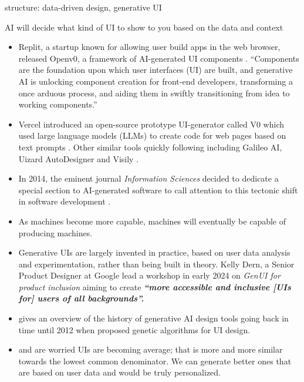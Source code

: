 \documentclass[
  letterpaper,
  DIV=11,
  numbers=noendperiod]{scrartcl}
\providecommand{\tightlist}{%
  \setlength{\itemsep}{0pt}\setlength{\parskip}{0pt}}\usepackage{longtable,booktabs,array}
\begin{document}
structure: data-driven design, generative UI

AI will decide what kind of UI to show to you based on the data and
context

\begin{itemize}
\tightlist
\item
  Replit, a startup known for allowing user build apps in the web
  browser, released Openv0, a framework of AI-generated UI components
  \citep{replitReplitOpenv0OpenSource2023}. ``Components are the
  foundation upon which user interfaces (UI) are built, and generative
  AI is unlocking component creation for front-end developers,
  transforming a once arduous process, and aiding them in swiftly
  transitioning from idea to working components.''
\item
  Vercel introduced an open-source prototype UI-generator called V0
  which used large language models (LLMs) to create code for web pages
  based on text prompts \citep{vercelIntroducingV0Generative2023}. Other
  similar tools quickly following including Galileo AI, Uizard
  AutoDesigner and Visily \citep{WhoBenefitsMost2024}.
\item
  In 2014, the eminent journal \emph{Information Sciences} decided to
  dedicate a special section to AI-generated software to call attention
  to this tectonic shift in software development
  \citep{reformatSpecialSectionApplications2014}.
\item
  As machines become more capable, machines will eventually be capable
  of producing machines.
\item
  Generative UIs are largely invented in practice, based on user data
  analysis and experimentation, rather than being built in theory. Kelly
  Dern, a Senior Product Designer at Google lead a workshop in early
  2024 on \emph{GenUI for product inclusion} aiming to create
  \textbf{\emph{``\textbf{more accessible and inclusive {[}UIs for{]}
  users of all backgrounds}''.}}
\item
  \citep{GenerativeUIDesign2023} gives an overview of the history of
  generative AI design tools going back in time until 2012 when
  \citep{troianoGeneticAlgorithmsSupporting2014} proposed genetic
  algorithms for UI design.
\item
  \citep{fletcherGenerativeUIDownfall2023} and
  \citep{joeblairGenerativeUINew2024} are worried UIs are becoming
  average; that is more and more similar towards the lowest common
  denominator. We can generate better ones that are based on user data
  and would be truly personalized.

\end{itemize}
\end{document}
